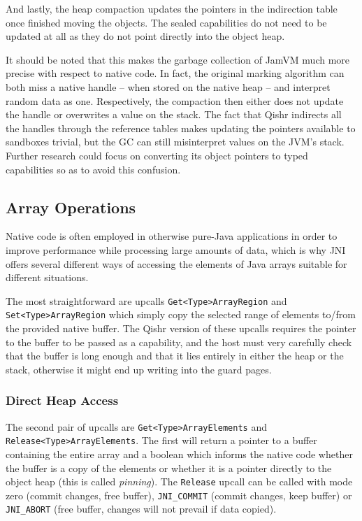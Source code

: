 \documentclass[a4paper,12pt,twoside,openright]{report}
\begin{document}
And lastly, the heap compaction updates the pointers in the indirection table once finished moving the objects. The sealed capabilities do not need to be updated at all as they do not point directly into the object heap.

It should be noted that this makes the garbage collection of JamVM much more precise with respect to native code. In fact, the original marking algorithm can both miss a native handle -- when stored on the native heap -- and interpret random data as one. Respectively, the compaction then either does not update the handle or overwrites a value on the stack. The fact that Qishr indirects all the handles through the reference tables makes updating the pointers available to sandboxes trivial, but the GC can still misinterpret values on the JVM's stack. Further research could focus on converting its object pointers to typed capabilities so as to avoid this confusion.

\subsection{Array Operations}

Native code is often employed in otherwise pure-Java applications in order to improve performance while processing large amounts of data, which is why JNI offers several different ways of accessing the elements of Java arrays suitable for different situations.

The most straightforward are upcalls \texttt{Get\-<Type>\-Array\-Region} and \texttt{Set\-<Type>\-Array\-Region} which simply copy the selected range of elements to/from the provided native buffer. The Qishr version of these upcalls requires the pointer to the buffer to be passed as a capability, and the host must very carefully check that the buffer is long enough and that it lies entirely in either the heap or the stack, otherwise it might end up writing into the guard pages. 

\subsubsection{Direct Heap Access}
\label{sec:DirectHeapAccess}

The second pair of upcalls are \texttt{Get\-<Type>\-Array\-Elements} and \texttt{Release\-<Type>\-Array\-Elements}. The first will return a pointer to a buffer containing the entire array and a boolean which informs the native code whether the buffer is a copy of the elements or whether it is a pointer directly to the object heap (this is called \emph{pinning}). The \texttt{Release} upcall can be called with mode zero (commit changes, free buffer), \texttt{JNI\_COMMIT} (commit changes, keep buffer) or \texttt{JNI\_ABORT} (free buffer, changes will not prevail if data copied). 
\end{document}
